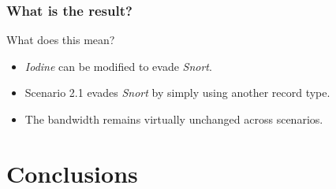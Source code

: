 \documentclass{beamer}
\begin{document}
\begin{frame}
\frametitle{What is the result?}

\begin{table}[H]
    \centering
    \label{tab:result_summary}
\end{table}

\pause

What does this mean?

\pause

\begin{itemize}
    \item<1-> \textit{Iodine} can be modified to evade \textit{Snort}.
    \item<4-> Scenario 2.1 evades \textit{Snort} by simply using another record type.
    \item<5-> The bandwidth remains virtually unchanged across scenarios.
\end{itemize}

\end{frame}


\section{Conclusions}
\end{document}
